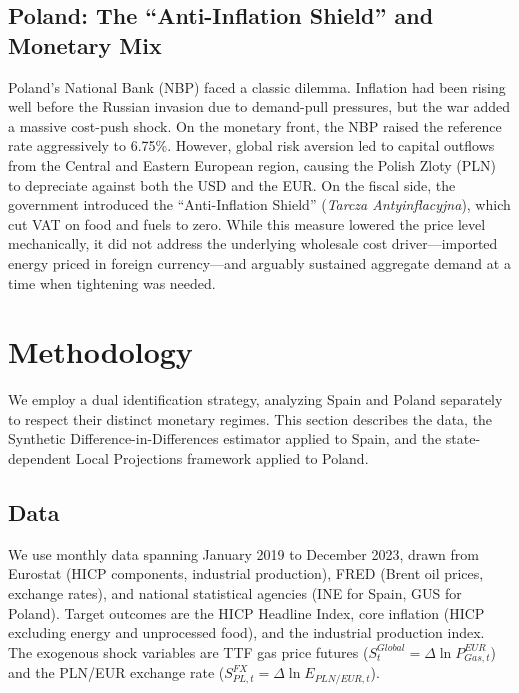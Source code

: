 \documentclass[12pt, a4paper]{article}
\begin{document}
\subsection{Poland: The ``Anti-Inflation Shield'' and Monetary Mix}

Poland's National Bank (NBP) faced a classic dilemma. Inflation had been rising well before the Russian invasion due to demand-pull pressures, but the war added a massive cost-push shock. On the monetary front, the NBP raised the reference rate aggressively to 6.75\%. However, global risk aversion led to capital outflows from the Central and Eastern European region, causing the Polish Zloty (PLN) to depreciate against both the USD and the EUR. On the fiscal side, the government introduced the ``Anti-Inflation Shield'' (\textit{Tarcza Antyinflacyjna}), which cut VAT on food and fuels to zero. While this measure lowered the price level mechanically, it did not address the underlying wholesale cost driver---imported energy priced in foreign currency---and arguably sustained aggregate demand at a time when tightening was needed.



\section{Methodology}

We employ a dual identification strategy, analyzing Spain and Poland separately to respect their distinct monetary regimes. This section describes the data, the Synthetic Difference-in-Differences estimator applied to Spain, and the state-dependent Local Projections framework applied to Poland.


\subsection{Data}

We use monthly data spanning January 2019 to December 2023, drawn from Eurostat (HICP components, industrial production), FRED (Brent oil prices, exchange rates), and national statistical agencies (INE for Spain, GUS for Poland). Target outcomes are the HICP Headline Index, core inflation (HICP excluding energy and unprocessed food), and the industrial production index. The exogenous shock variables are TTF gas price futures ($S^{Global}_t = \Delta\ln P_{Gas,t}^{EUR}$) and the PLN/EUR exchange rate ($S^{FX}_{PL,t} = \Delta\ln E_{PLN/EUR,t}$).
\end{document}
